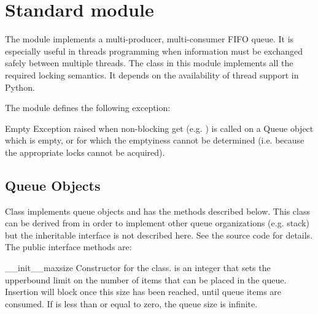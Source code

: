 \section{Standard module }

\label{module-Queue}


The  module implements a multi-producer, multi-consumer
FIFO queue.  It is especially useful in threads programming when
information must be exchanged safely between multiple threads.  The
 class in this module implements all the required locking
semantics.  It depends on the availability of thread support in
Python.

The  module defines the following exception:

\renewcommand{\indexsubitem}{(in module Queue)}

\begin{excdesc}{Empty}
Exception raised when non-blocking get (e.g. ) is
called on a Queue object which is empty, or for which the emptyiness
cannot be determined (i.e. because the appropriate locks cannot be
acquired).
\end{excdesc}

\subsection{Queue Objects}

Class  implements queue objects and has the methods
described below.  This class can be derived from in order to implement
other queue organizations (e.g. stack) but the inheritable interface
is not described here.  See the source code for details.  The public
interface methods are:

\renewcommand{\indexsubitem}{(__init__ method)}

\begin{funcdesc}{__init__}{maxsize}
Constructor for the class.   is an integer that sets the
upperbound limit on the number of items that can be placed in the
queue.  Insertion will block once this size has been reached, until
queue items are consumed.  If  is less than or equal to
zero, the queue size is infinite.
\end{funcdesc}

